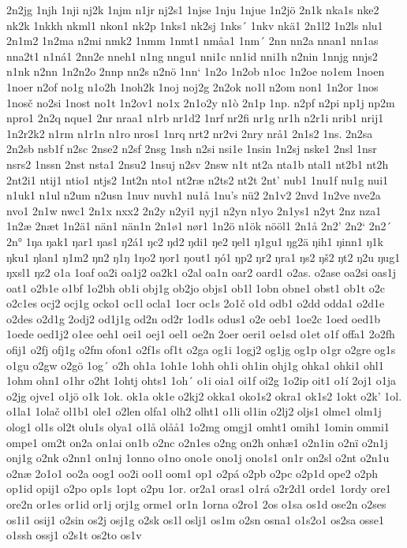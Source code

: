 2n2jg
1njh
1nji
nj2k
1njm
n1jr
nj2s1
1njse
1nju
1njue
1n2jö
2n1k
nka1s
nke2
nk2k
1nkkh
nkml1
nkon1
nk2p
1nks1
nk2sj
1nks´
1nkv
nkä1
2n1l2
1n2ls
nlu1
2n1m2
1n2ma
n2mi
nmk2
1nmm
1nmt1
nmåa1
1nm´
2nn
nn2a
nnan1
nn1as
nna2t1
n1ná1
2nn2e
nneh1
n1ng
nngu1
nni1c
nn1id
nni1h
n2nin
1nnjg
nnjs2
n1nk
n2nn
1n2n2o
2nnp
nn2s
n2nö
1nn`
1n2o
1n2ob
n1oc
1n2oe
no1em
1noen
1noer
n2of
no1g
n1o2h
1noh2k
1noj
noj2g
2n2ok
no1l
n2om
non1
1n2or
1nos
1nosč
no2si
1nost
no1t
1n2ov1
no1x
2n1o2y
n1ò
2n1p
1np.
n2pf
n2pi
np1j
np2m
npro1
2n2q
nque1
2nr
nraa1
n1rb
nr1d2
1nrf
nr2fi
nr1g
nr1h
n2r1i
nrib1
nrij1
1n2r2k2
n1rm
n1r1n
n1ro
nros1
1nrq
nrt2
nr2vi
2nry
nrå1
2n1s2
1ns.
2n2sa
2n2sb
nsb1f
n2sc
2nse2
n2sf
2nsg
1nsh
n2si
nsi1e
1nsin
1n2sj
nske1
2nsl
1nsr
nsrs2
1nssn
2nst
nsta1
2nsu2
1nsuj
n2sv
2nsw
n1t
nt2a
nta1b
ntal1
nt2b1
nt2h
2nt2i1
ntij1
ntio1
ntjs2
1nt2n
nto1
nt2ræ
n2ts2
nt2t
2nt'
nub1
1nu1f
nu1g
nui1
n1uk1
n1ul
n2um
n2usn
1nuv
nuvh1
nu1å
1nu's
nü2
2n1v2
2nvd
1n2ve
nve2a
nvo1
2n1w
nwc1
2n1x
nxx2
2n2y
n2yi1
nyj1
n2yn
n1yo
2n1ys1
n2yt
2nz
nza1
1n2æ
2næt
1n2ä1
nän1
nän1n
2n1ø1
nør1
1n2ö
n1ök
nööl1
2n1å
2n2'
2n2`
2n2´
2n°
1ŋa
ŋak1
ŋar1
ŋas1
ŋ2á1
ŋc2
ŋd2
ŋdi1
ŋe2
ŋel1
ŋ1gu1
ŋg2ä
ŋih1
ŋinn1
ŋ1k
ŋku1
ŋlan1
ŋ1m2
ŋn2
ŋ1ŋ
1ŋo2
ŋor1
ŋout1
ŋó1
ŋp2
ŋr2
ŋra1
ŋs2
ŋš2
ŋt2
ŋ2u
ŋug1
ŋxsl1
ŋz2
o1a
1oaf
oa2i
oa1j2
oa2k1
o2al
oa1n
oar2
oard1
o2as.
o2ase
oa2si
oas1j
oat1
o2b1e
o1bf
1o2bh
ob1i
obj1g
ob2jo
objs1
ob1l
1obn
obne1
obst1
ob1t
o2c
o2c1es
ocj2
ocj1g
ocko1
oc1l
ocla1
1ocr
oc1s
2o1č
o1d
odb1
o2dd
odda1
o2d1e
o2des
o2d1g
2odj2
od1j1g
od2n
od2r
1od1s
odus1
o2e
oeb1
1oe2c
1oed
oed1b
1oede
oed1j2
o1ee
oeh1
oei1
oej1
oel1
oe2n
2oer
oeri1
oe1sd
o1et
o1f
offa1
2o2fh
ofij1
o2fj
ofj1g
o2fm
ofon1
o2f1s
of1t
o2ga
og1i
1ogj2
og1jg
og1p
o1gr
o2gre
og1s
o1gu
o2gw
o2gö
1og´
o2h
oh1a
1oh1e
1ohh
oh1i
oh1in
ohj1g
ohka1
ohki1
ohl1
1ohm
ohn1
o1hr
o2ht
1ohtj
ohts1
1oh´
o1i
oia1
oi1f
oi2g
1o2ip
oit1
o1í
2oj1
o1ja
o2jg
ojve1
o1jö
o1k
1ok.
ok1a
ok1e
o2kj2
okka1
oko1s2
okra1
ok1s2
1okt
o2k'
1ol.
o1la1
1olač
ol1b1
ole1
o2len
olfa1
olh2
olht1
o1li
ol1in
o2lj2
oljs1
olme1
olm1j
olog1
ol1s
ol2t
olu1s
olya1
o1lå
olåå1
1o2mg
omgj1
omht1
omih1
1omin
ommi1
ompe1
om2t
on2a
on1ai
on1b
o2nc
o2n1es
o2ng
on2h
onhæ1
o2n1in
o2nï
o2n1j
onj1g
o2nk
o2nn1
on1nj
1onno
o1no
ono1e
ono1j
ono1s1
on1r
on2sl
o2nt
o2n1u
o2næ
2o1o1
oo2a
oog1
oo2i
oo1l
oom1
op1
o2pá
o2pb
o2pc
o2p1d
ope2
o2ph
op1id
opij1
o2po
op1s
1opt
o2pu
1or.
or2a1
oras1
o1rá
o2r2d1
orde1
1ordy
ore1
ore2n
or1es
or1id
or1j
orj1g
orme1
or1n
1orna
o2ro1
2os
o1sa
os1d
ose2n
o2ses
os1i1
osij1
o2sin
os2j
osj1g
o2sk
os1l
oslj1
os1m
o2sn
osna1
o1s2o1
os2sa
osse1
o1ssh
ossj1
o2s1t
os2to
os1v
